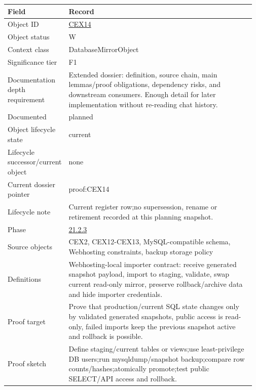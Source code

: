 \begin{longtable}{L{0.16\linewidth} L{0.81\linewidth}}
\hline
\textbf{Field} & \textbf{Record}\\
\hline
Object ID & \hyperlink{object-row-CEX14}{CEX14}\\
\hline\addlinespace[0.20em]
Object status & W\\
\hline\addlinespace[0.20em]
Context class & DatabaseMirrorObject\\
\hline\addlinespace[0.20em]
Significance tier & F1\\
\hline\addlinespace[0.20em]
Documentation depth requirement & Extended dossier: definition, source chain, main lemmas/\allowbreak{}proof obligations, dependency risks, and downstream consumers. Enough detail for later implementation without re-reading chat history.\\
\hline\addlinespace[0.20em]
Documented & planned\\
\hline\addlinespace[0.20em]
Object lifecycle state & current\\
\hline\addlinespace[0.20em]
Lifecycle successor/\allowbreak{}current object & none\\
\hline\addlinespace[0.20em]
Current dossier pointer & proof:CEX14\\
\hline\addlinespace[0.20em]
Lifecycle note & Current register row;\newline no supersession, rename or retirement recorded at this planning snapshot.\\
\hline\addlinespace[0.20em]
Phase & \hyperlink{phase-row-21-2-3}{21.2.3}\\
\hline\addlinespace[0.20em]
Source objects & CEX2, CEX12-CEX13, MySQL-compatible schema, Webhosting constraints, backup storage policy\\
\hline\addlinespace[0.20em]
Definitions & Webhosting-local importer contract: receive generated snapshot payload, import to staging, validate, swap current read-only mirror, preserve rollback/\allowbreak{}archive data and hide importer credentials.\\
\hline\addlinespace[0.20em]
Proof target & Prove that production/\allowbreak{}current SQL state changes only by validated generated snapshots, public access is read-only, failed imports keep the previous snapshot active and rollback is possible.\\
\hline\addlinespace[0.20em]
Proof sketch & Define staging/\allowbreak{}current tables or views;\newline use least-privilege DB users;\newline run mysqldump/\allowbreak{}snapshot backup;\newline compare row counts/\allowbreak{}hashes;\newline atomically promote;\newline test public SELECT/\allowbreak{}API access and rollback.\\

\end{longtable}
